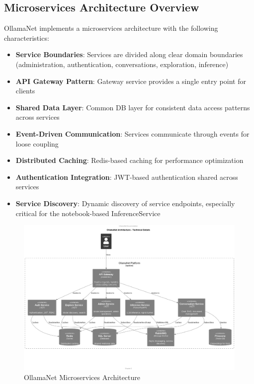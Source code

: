\subsection{Microservices Architecture Overview}

OllamaNet implements a microservices architecture with the following characteristics:

\begin{itemize}
    \item \textbf{Service Boundaries}: Services are divided along clear domain boundaries (administration, authentication, conversations, exploration, inference)
    \item \textbf{API Gateway Pattern}: Gateway service provides a single entry point for clients
    \item \textbf{Shared Data Layer}: Common DB layer for consistent data access patterns across services
    \item \textbf{Event-Driven Communication}: Services communicate through events for loose coupling
    \item \textbf{Distributed Caching}: Redis-based caching for performance optimization
    \item \textbf{Authentication Integration}: JWT-based authentication shared across services
    \item \textbf{Service Discovery}: Dynamic discovery of service endpoints, especially critical for the notebook-based InferenceService
\end{itemize}

\begin{figure}[p]
    \centering
    \includegraphics[width=\textwidth]{./Chapter02/figures/OllamaNet_Architecture_Details.png}
    \caption{OllamaNet Microservices Architecture}
    \label{fig:ollamanet-arch-details}
\end{figure}
\clearpage


